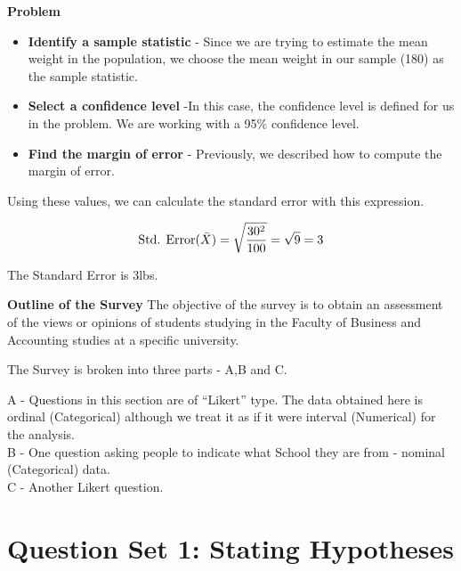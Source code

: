 \noindent  \textbf{Problem}

\begin{itemize}
	\item
	\textbf{Identify a sample statistic} - Since we are trying to estimate the mean weight in the population, we choose the mean weight in our sample (180) as the sample statistic.
	
	
	\item \textbf{Select a confidence level}  -In this case, the confidence level is defined for us in the problem. We are working with a 95\% confidence level.
	
	
	\item \textbf{Find the margin of error} - Previously, we described how to compute the margin of error.
\end{itemize}





Using these values, we can calculate the standard error with this expression.

\vspace{0.1cm}
\[
\mbox{Std. Error}(\bar{X})  = \sqrt{{30^2\over 100}} = \sqrt{9}
= 3\]

\vspace{0.1cm}

The Standard Error is 3lbs.



\noindent  \textbf{Outline of the Survey}
The objective of the survey is to obtain an assessment of the views or opinions of students studying in the Faculty of Business and Accounting studies at a specific university.

\vspace{0.4cm}

The Survey is broken into three parts - A,B and C. \\ \vspace{0.2cm}

A - Questions in this section are of ``Likert'' type. The data obtained here is ordinal (Categorical) although we treat it as if it were interval (Numerical) for the analysis.\\
\vspace{0.2cm}
B - One question asking people to indicate what School they are from - nominal (Categorical) data.\\
\vspace{0.2cm}
C - Another Likert question.




\newpage	
\section*{Question Set 1: Stating Hypotheses}


